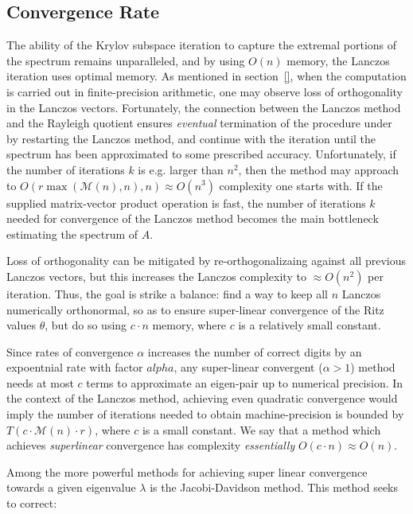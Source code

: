 \documentclass[10pt]{article}
\numberwithin{equation}{section}
\newcommand{\+}{%
	\raisebox{0.18ex}{\scaleobj{0.55}{+}}
}
\theoremstyle{definition}
\theoremstyle{definition}
\begin{document}
\subsection*{Convergence Rate}
The ability of the Krylov subspace iteration to capture the extremal portions of the spectrum remains unparalleled, and by using $O(n)$ memory, the Lanczos iteration uses optimal memory. 
As mentioned in section~\ref{}, when the computation is carried out in finite-precision arithmetic, one may observe loss of orthogonality in the Lanczos vectors. 
Fortunately, the connection between the Lanczos method and the Rayleigh quotient ensures \emph{eventual} termination of the procedure under by restarting the Lanczos method, and continue with the iteration until the spectrum has been approximated to some prescribed accuracy. 
Unfortunately, if the number of iterations $k$ is e.g. larger than $n^2$, then the method may approach to $O(r\max(\mathcal{M}(n), n), n) \approx O(n^3)$ complexity one starts with. 
If the supplied matrix-vector product operation is fast, the number of iterations $k$ needed for convergence of the Lanczos method becomes the main bottleneck estimating the spectrum of $A$.

Loss of orthogonality can be mitigated by re-orthogonalizaing against all previous Lanczos vectors, but this increases the Lanczos complexity to $\approx O(n^2)$ per iteration. 
Thus, the goal is strike a balance: find a way to keep all $n$ Lanczos numerically orthonormal, so as to ensure super-linear convergence of the Ritz values $\theta$, but do so using $c \cdot n$ memory, where $c$ is a relatively small constant.

Since rates of convergence $\alpha$ increases the number of correct digits by an expoentnial rate with factor $alpha$, any super-linear convergent ($\alpha > 1$) method needs at most $c$ terms to approximate an eigen-pair up to numerical precision. 
In the context of the Lanczos method, achieving even quadratic convergence would imply the number of iterations needed to obtain machine-precision is bounded by $T(c \cdot \mathcal{M}(n) \cdot r)$, where $c$ is a small constant. We say that a method which achieves \emph{superlinear} convergence has complexity \emph{essentially} $O(c\cdot n) \approx O(n)$.


Among the more powerful methods for achieving super linear convergence towards a given eigenvalue $\lambda$ is the Jacobi-Davidson method. This method seeks to correct:
\end{document}
